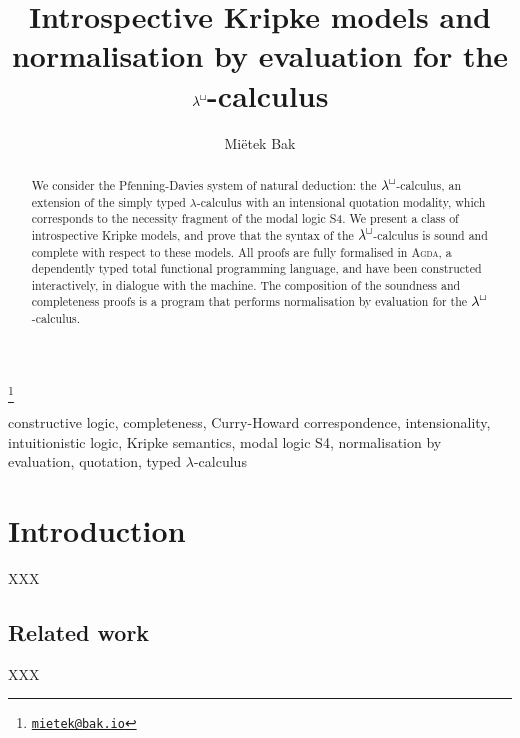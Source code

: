 \documentclass{entcs}
\newcommand{\sq}{\mathop{\Box}}
\newcommand{\Agda}{\textsc{Agda}}
\newcommand{\lambdabox}{\lambda^{\mkern-1mu\sq\mkern-3mu}}
\begin{document}
\begin{frontmatter}


\title{Introspective Kripke models and\\normalisation by evaluation for the $\lambdabox$-calculus}

\author{Mi{\"e}tek Bak}

\address{Least Fixed Ltd, Cambridge, UK}

\thanks[email]{\href{mailto:mietek@bak.io}{\textnormal{\texttt{mietek@bak.io}}}}


\begin{abstract}
  We consider the Pfenning-Davies system of natural deduction: the $\lambdabox$-calculus, an extension of the simply typed $\lambda$-calculus with an intensional quotation modality, which corresponds to the necessity fragment of the modal logic S4.  We present a class of introspective Kripke models, and prove that the syntax of the $\lambdabox$-calculus is sound and complete with respect to these models.  All proofs are fully formalised in \Agda, a dependently typed total functional programming language, and have been constructed interactively, in dialogue with the machine.  The composition of the soundness and completeness proofs is a program that performs normalisation by evaluation for the $\lambdabox$-calculus.
\end{abstract}

\begin{keyword}
  constructive logic, completeness, Curry-Howard correspondence, intensionality, intuitionistic logic, Kripke semantics, modal logic S4, normalisation by evaluation, quotation, typed $\lambda$-calculus
\end{keyword}

\end{frontmatter}




\section{Introduction}
XXX

\subsection*{Related work}
XXX


\end{document}
